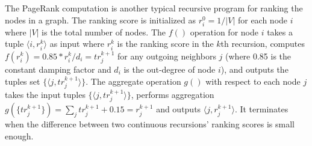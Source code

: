  The PageRank computation is another typical recursive program for ranking the nodes in a graph. The ranking score is initialized as $r_i^0=1/|V|$ for each node $i$ where $|V|$ is the total number of nodes. The $f()$ operation for node $i$ takes a tuple $\langle i,r_i^k\rangle$ as input where $r_i^k$ is the ranking score in the $k$th recursion, computes $f(r_i^k)=0.85*r_i^k/d_i=tr_j^{k+1}$ for any outgoing neighbors $j$ (where 0.85 is the constant damping factor and $d_i$ is the out-degree of node $i$), and outputs the tuples set $\{\langle j,tr_j^{k+1}\rangle\}$. The aggregate operation $g()$ with respect to each node $j$ takes the input tuples $\{\langle j,tr_j^{k+1}\rangle\}$, performs aggregation $g(\{tr_j^{k+1}\})=\sum_j{tr_j^{k+1}}+0.15=r_j^{k+1}$ and outputs $\langle j,r_j^{k+1}\rangle$. It terminates when the difference between two continuous recursions' ranking scores is small enough.
